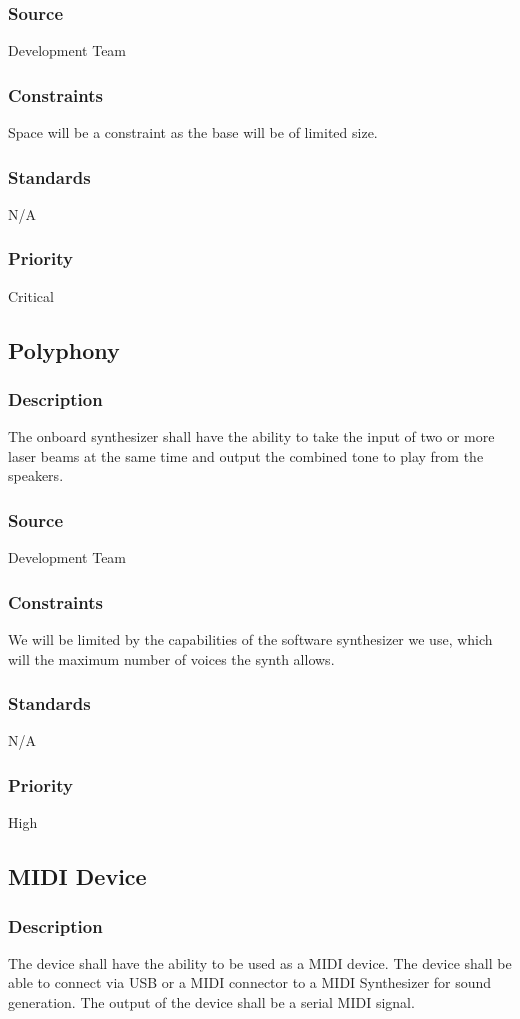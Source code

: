 \subsubsection{Source}
Development Team
\subsubsection{Constraints}
Space will be a constraint as the base will be of limited size.
\subsubsection{Standards}
N/A
\subsubsection{Priority}
Critical

\subsection{Polyphony}
\subsubsection{Description}
The onboard synthesizer shall have the ability to take the input of two or more laser beams at the same time and output the combined tone to play from the speakers.
\subsubsection{Source}
Development Team
\subsubsection{Constraints}
We will be limited by the capabilities of the software synthesizer we use, which will the maximum number of voices the synth allows.
\subsubsection{Standards}
N/A
\subsubsection{Priority}
High


\subsection{MIDI Device}
\subsubsection{Description}
The device shall have the ability to be used as a MIDI device. The device shall be able to connect via USB or a MIDI connector to a MIDI Synthesizer for sound generation. The output of the device shall be a serial MIDI signal.

